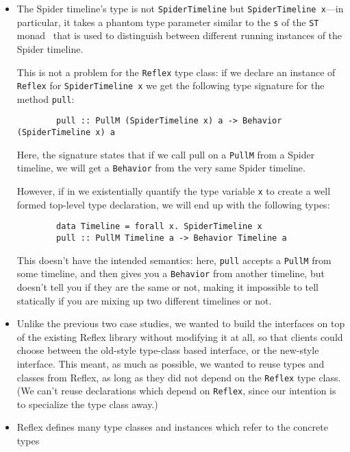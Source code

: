 \begin{itemize}
    \item The Spider timeline's type is not \verb|SpiderTimeline|
        but \verb|SpiderTimeline x|---in particular, it takes a phantom
        type parameter similar to the \verb|s| of the \verb|ST|
        monad~\cite{Launchbury:1994:LFS:773473.178246} that is used to
        distinguish between different running instances of the Spider
        timeline.

        This is not a problem for the \verb|Reflex| type class:
        if we declare an instance of \verb|Reflex| for \verb|SpiderTimeline x|
        we get the following type signature for the method \verb|pull|:

        \begin{lstlisting}
        pull :: PullM (SpiderTimeline x) a -> Behavior (SpiderTimeline x) a
        \end{lstlisting}

        Here, the signature states that if we call pull on a \verb|PullM|
        from a Spider timeline, we will get a \verb|Behavior|
        from the very same Spider timeline.

        However, if in \Backpack{} we existentially quantify
        the type variable \verb|x| to create a well formed
        top-level type declaration, we will end up with the
        following types:

        \begin{lstlisting}
        data Timeline = forall x. SpiderTimeline x
        pull :: PullM Timeline a -> Behavior Timeline a
        \end{lstlisting}

        This doesn't have the intended semantics: here, \verb|pull|
        accepts a \verb|PullM| from some timeline, and then gives
        you a \verb|Behavior| from another timeline, but doesn't tell
        you if they are the same or not, making it impossible to tell
        statically if you are mixing up two different timelines or not.

    \item Unlike the previous two case studies, we wanted to build
        the \Backpack{} interfaces on top of the existing Reflex
        library without modifying it at all, so that clients could
        choose between the old-style type-class based interface, or
        the new-style \Backpack{} interface.  This meant, as much
        as possible, we wanted to reuse types and classes from
        Reflex, as long as they did not depend on the \verb|Reflex|
        type class.  (We can't reuse declarations which depend
        on \verb|Reflex|, since our intention is to specialize the
        type class away.)

    \item Reflex defines many type classes and instances which
        refer to the concrete types
\end{itemize}

